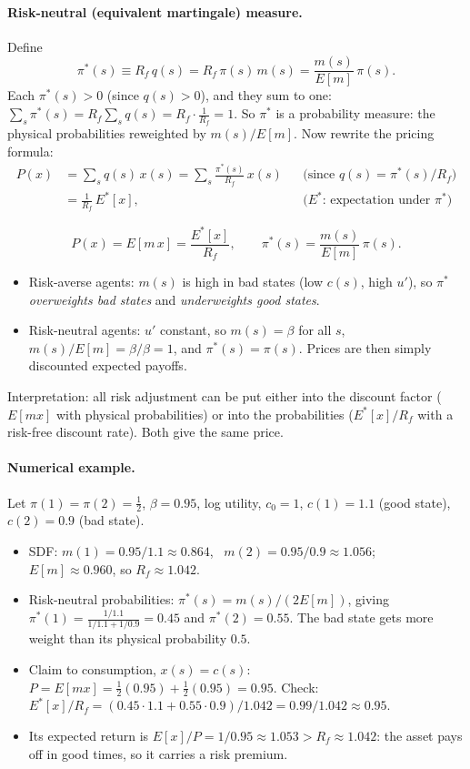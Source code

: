 \paragraph{Risk-neutral (equivalent martingale) measure.} Define
\[
  \pi^*(s)\equiv R_f\,q(s) = R_f\,\pi(s)\,m(s) = \frac{m(s)}{E[m]}\,\pi(s).
\]
Each $\pi^*(s)>0$ (since $q(s)>0$), and they sum to one:
$\sum_s\pi^*(s)=R_f\sum_sq(s)=R_f\cdot\frac{1}{R_f}=1$. So $\pi^*$ is a probability measure: the physical probabilities reweighted by $m(s)/E[m]$. Now rewrite the pricing formula:
\begin{align*}
  P(x) &= \sum_s q(s)\,x(s) = \sum_s \frac{\pi^*(s)}{R_f}\,x(s) && \text{(since $q(s)=\pi^*(s)/R_f$)}\\
       &= \frac{1}{R_f}\,E^*[x], && \text{($E^*$: expectation under $\pi^*$)}
\end{align*}
\begin{keybox}[title=Risk-neutral pricing]
\[
  P(x) = E[m\,x] = \frac{E^*[x]}{R_f},\qquad \pi^*(s)=\frac{m(s)}{E[m]}\,\pi(s).
\]
\begin{itemize}
  \item Risk-averse agents: $m(s)$ is high in bad states (low $c(s)$, high $u'$), so $\pi^*$ \emph{overweights bad states} and \emph{underweights good states}.
  \item Risk-neutral agents: $u'$ constant, so $m(s)=\beta$ for all $s$, $m(s)/E[m]=\beta/\beta=1$, and $\pi^*(s)=\pi(s)$. Prices are then simply discounted expected payoffs.
\end{itemize}
\end{keybox}
Interpretation: all risk adjustment can be put either into the discount factor ($E[mx]$ with physical probabilities) or into the probabilities ($E^*[x]/R_f$ with a risk-free discount rate). Both give the same price.

\paragraph{Numerical example.} Let $\pi(1)=\pi(2)=\tfrac12$, $\beta=0.95$, log utility, $c_0=1$, $c(1)=1.1$ (good state), $c(2)=0.9$ (bad state).
\begin{itemize}
  \item SDF: $m(1)=0.95/1.1\approx0.864$, \ $m(2)=0.95/0.9\approx1.056$; \ $E[m]\approx0.960$, so $R_f\approx1.042$.
  \item Risk-neutral probabilities: $\pi^*(s)=m(s)/(2E[m])$, giving $\pi^*(1)=\frac{1/1.1}{1/1.1+1/0.9}=0.45$ and $\pi^*(2)=0.55$. The bad state gets more weight than its physical probability $0.5$.
  \item Claim to consumption, $x(s)=c(s)$: $P=E[mx]=\tfrac12(0.95)+\tfrac12(0.95)=0.95$. Check: $E^*[x]/R_f=(0.45\cdot1.1+0.55\cdot0.9)/1.042=0.99/1.042\approx0.95$.
  \item Its expected return is $E[x]/P=1/0.95\approx1.053>R_f\approx1.042$: the asset pays off in good times, so it carries a risk premium.
\end{itemize}

